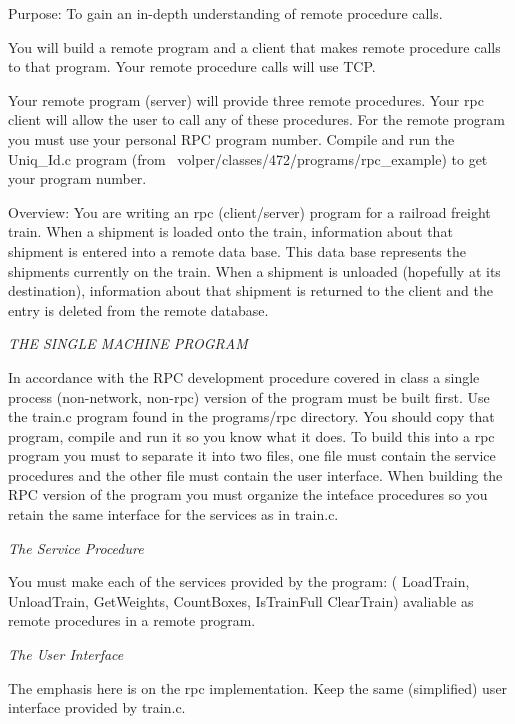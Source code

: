 

\parindent 0pt

Purpose: To gain an in-depth understanding of
remote procedure calls.

You will build a remote program and a client that makes remote procedure calls 
to that program.
Your remote procedure calls will use TCP.

Your remote program (server) will provide three remote procedures.
Your rpc client will allow the user to call any of these procedures.
For the remote program you must use your personal RPC program
number.
Compile and run the {\ltt{}Uniq_Id.c} program 
(from {\ltt{}~volper/classes/472/programs/rpc_example})
to get your program number.

Overview: You are writing an rpc (client/server) program for a railroad freight
train.
When a shipment is loaded onto the train, information about
that shipment is entered into a remote data base.
This data base represents the shipments currently on the train.
When a shipment is unloaded (hopefully at its destination),
information about that shipment is returned to the client
and the entry is deleted from the remote database.

{\it THE SINGLE MACHINE PROGRAM} 

In accordance with the RPC development procedure covered in class a
single process (non-network, non-rpc) version of the program must be
built first. Use the {\ltt{}train.c} program found in the 
{\ltt{}programs/rpc} directory.
You should copy that program, compile and run it so you know what it does.
To build this into a rpc program you must to separate it into two files, 
one file must contain the service procedures 
and the other file must contain the user interface.
When building the RPC version of the program you must
organize the inteface procedures so you retain the same interface
for the services as in {\ltt{}train.c}.

{\it The Service Procedure}

You must make each of the services provided by the program:
( {\ltt{}LoadTrain}, {\ltt{}UnloadTrain}, {\ltt{}GetWeights},
{\ltt{}CountBoxes}, {\ltt{}IsTrainFull} {\ltt{}ClearTrain})
avaliable as remote procedures in a remote program.

{\it The User Interface}

The emphasis here is on the rpc implementation.
Keep the same (simplified) user interface provided by {\ltt{}train.c}. 

